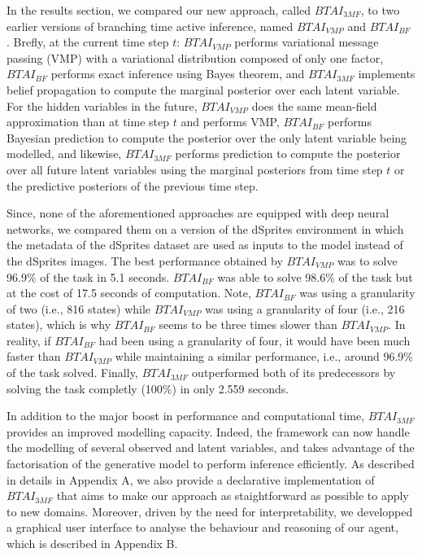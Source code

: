 \documentclass[twoside,11pt]{article}
\begin{document}
In the results section, we compared our new approach, called $BTAI_{3MF}$, to two earlier versions of branching time active inference, named $BTAI_{VMP}$ \citep{AITS_THEORY,AITS_PRACTICE} and $BTAI_{BF}$ \citep{BTAI_BF}. Brefly, at the current time step $t$: $BTAI_{VMP}$ performs variational message passing (VMP) with a variational distribution composed of only one factor, $BTAI_{BF}$ performs exact inference using Bayes theorem, and $BTAI_{3MF}$ implements belief propagation to compute the marginal posterior over each latent variable. For the hidden variables in the future, $BTAI_{VMP}$ does the same mean-field approximation than at time step $t$ and performs VMP, $BTAI_{BF}$ performs Bayesian prediction to compute the posterior over the only latent variable being modelled, and likewise, $BTAI_{3MF}$ performs prediction to compute the posterior over all future latent variables using the marginal posteriors from time step $t$ or the predictive posteriors of the previous time step.

Since, none of the aforementioned approaches are equipped with deep neural networks, we compared them on a version of the dSprites environment in which the metadata of the dSprites dataset are used as inputs to the model instead of the dSprites images. The best performance obtained by $BTAI_{VMP}$ was to solve 96.9\% of the task in 5.1 seconds. $BTAI_{BF}$ was able to solve 98.6\% of the task but at the cost of 17.5 seconds of computation. Note, $BTAI_{BF}$ was using a granularity of two (i.e., 816 states) while $BTAI_{VMP}$ was using a granularity of four (i.e., 216 states), which is why $BTAI_{BF}$ seems to be three times slower than $BTAI_{VMP}$. In reality, if $BTAI_{BF}$ had been using a granularity of four, it would have been much faster than $BTAI_{VMP}$ while maintaining a similar performance, i.e., around 96.9\% of the task solved. Finally, $BTAI_{3MF}$ outperformed both of its predecessors by solving the task completly (100\%) in only 2.559 seconds.

In addition to the major boost in performance and computational time, $BTAI_{3MF}$ provides an improved modelling capacity. Indeed, the framework can now handle the modelling of several observed and latent variables, and takes advantage of the factorisation of the generative model to perform inference efficiently. As described in details in Appendix A, we also provide a declarative implementation of $BTAI_{3MF}$ that aims to make our approach as staightforward as possible to apply to new domains. Moreover, driven by the need for interpretability, we developped a graphical user interface to analyse the behaviour and reasoning of our agent, which is described in Appendix B.
\end{document}
